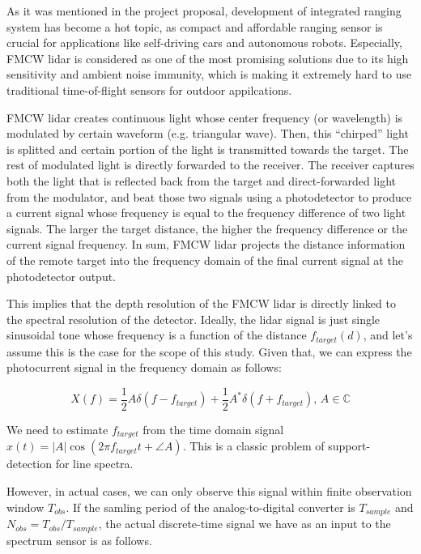 \documentclass[11pt,journal, onecolumn]{IEEEtran}
\theoremstyle{theorem}
\begin{document}
As it was mentioned in the project proposal, development of integrated ranging system has become a hot topic, as compact and affordable ranging sensor is crucial for applications like self-driving cars and autonomous robots. Especially, FMCW lidar is considered as one of the most promising solutions due to its high sensitivity and ambient noise immunity, which is making it extremely hard to use traditional time-of-flight sensors for outdoor appilcations.

FMCW lidar creates continuous light whose center frequency (or wavelength) is modulated by certain waveform (e.g. triangular wave). Then, this ``chirped'' light is splitted and certain portion of the light is transmitted towards the target. The rest of modulated light is directly forwarded to the receiver. The receiver captures both the light that is reflected back from the target and direct-forwarded light from the modulator, and beat those two signals using a photodetector to produce a current signal whose frequency is equal to the frequency difference of two light signals. The larger the target distance, the higher the frequency difference or the current signal frequency. In sum, FMCW lidar projects the distance information of the remote target into the frequency domain of the final current signal at the photodetector output. 

This implies that the depth resolution of the FMCW lidar is directly linked to the spectral resolution of the detector. Ideally, the lidar signal is just single sinusoidal tone whose frequency is a function of the distance $f_{target}(d)$, and let's assume this is the case for the scope of this study. Given that, we can express the photocurrent signal in the frequency domain as follows:

\begin{equation}
    X(f) = \frac{1}{2}A\delta(f-f_{target}) + \frac{1}{2}A^*\delta(f+f_{target}),\,A\in \mathbb{C}
\end{equation}

\noindent We need to estimate $f_{target}$ from the time domain signal $x(t) = |A|\cos({2\pi f_{target} t + \angle A})$. This is a classic problem of support-detection for line spectra.

However, in actual cases, we can only observe this signal within finite observation window $T_{obs}$. If the samling period of the analog-to-digital converter is $T_{sample}$ and $N_{obs} = T_{obs}/T_{sample}$, the actual discrete-time signal we have as an input to the spectrum sensor is as follows. 
\end{document}
